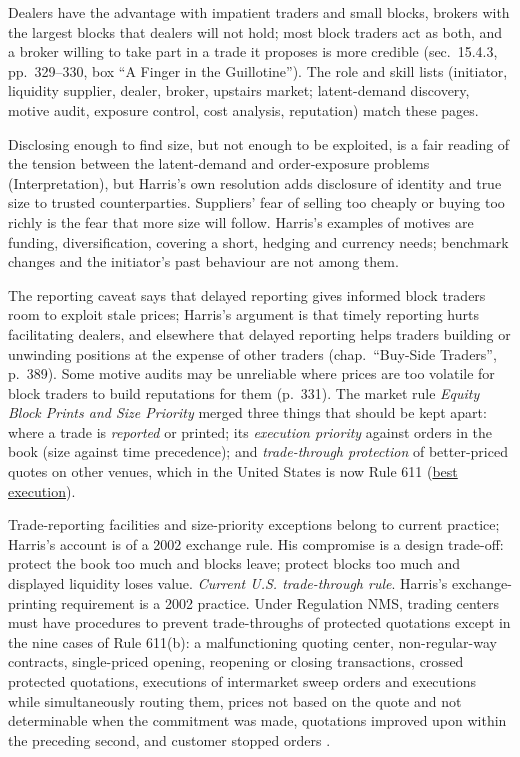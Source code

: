 \begin{qfdefinition}
Dealers have the advantage with impatient traders and small blocks, brokers with the largest blocks that dealers will not hold; most block traders act as both, and a broker willing to take part in a trade it proposes is more credible (sec.~15.4.3, pp.~329--330, box ``A Finger in the Guillotine''). The role and skill lists (initiator, liquidity supplier, dealer, broker, upstairs market; latent-demand discovery, motive audit, exposure control, cost analysis, reputation) match these pages.

 Disclosing enough to find size, but not enough to be exploited, is a fair reading of the tension between the latent-demand and order-exposure problems (Interpretation), but Harris's own resolution adds disclosure of identity and true size to trusted counterparties. Suppliers' fear of selling too cheaply or buying too richly is the fear that more size will follow. Harris's examples of motives are funding, diversification, covering a short, hedging and currency needs; benchmark changes and the initiator's past behaviour are not among them.

The reporting caveat says that delayed reporting gives informed block traders room to exploit stale prices; Harris's argument is that timely reporting hurts facilitating dealers, and elsewhere that delayed reporting helps traders building or unwinding positions at the expense of other traders (chap.~``Buy-Side Traders'', p.~389). Some motive audits may be unreliable where prices are too volatile for block traders to build reputations for them (p.~331). The market rule \emph{Equity Block Prints and Size Priority} merged three things that should be kept apart: where a trade is \emph{reported} or printed; its \emph{execution priority} against orders in the book (size against time precedence); and \emph{trade-through protection} of better-priced quotes on other venues, which in the United States is now Rule 611 (\hyperref[def:best-execution]{best execution}).

Trade-reporting facilities and size-priority exceptions belong to current practice; Harris's account is of a 2002 exchange rule. His compromise is a design trade-off: protect the book too much and blocks leave; protect blocks too much and displayed liquidity loses value. \emph{Current U.S. trade-through rule}. Harris's exchange-printing requirement is a 2002 practice. Under Regulation NMS, trading centers must have procedures to prevent trade-throughs of protected quotations except in the nine cases of Rule 611(b): a malfunctioning quoting center, non-regular-way contracts, single-priced opening, reopening or closing transactions, crossed protected quotations, executions of intermarket sweep orders and executions while simultaneously routing them, prices not based on the quote and not determinable when the commitment was made, quotations improved upon within the preceding second, and customer stopped orders \citep[17 CFR 242.611(b), eCFR text for 15 October 2026]{ecfr-17cfr242-611}.


\end{qfdefinition}
